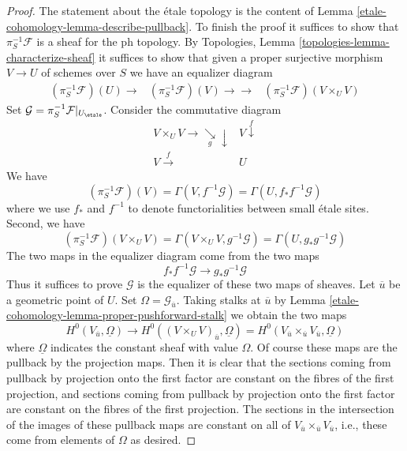 \begin{proof}
The statement about the \'etale topology is the content
of Lemma \ref{etale-cohomology-lemma-describe-pullback}. To finish the proof it
suffices to show that $\pi_S^{-1}\mathcal{F}$ is a sheaf for the ph
topology. By Topologies, Lemma \ref{topologies-lemma-characterize-sheaf}
it suffices to show that given a proper surjective morphism
$V \to U$ of schemes over $S$ we have an equalizer diagram
$$
\begin{array}{ccc}(\pi_S^{-1}\mathcal{F})(U) \longrightarrow & (\pi_S^{-1}\mathcal{F})(V) \longrightarrow\longrightarrow & (\pi_S^{-1}\mathcal{F})(V \times_U V)\end{array}
$$
Set $\mathcal{G} = \pi_S^{-1}\mathcal{F}|_{U_\etale}$.
Consider the commutative diagram
$$
\begin{array}{cc}V \times_U V \longrightarrow\underset{g}{\searrow}\downarrow & V \overset{f}{\downarrow} \\ V \overset{f}{\longrightarrow} & U\end{array}
$$
We have
$$
(\pi_S^{-1}\mathcal{F})(V) = \Gamma(V, f^{-1}\mathcal{G}) =
\Gamma(U, f_*f^{-1}\mathcal{G})
$$
where we use $f_*$ and $f^{-1}$ to denote functorialities between
small \'etale sites. Second, we have
$$
(\pi_S^{-1}\mathcal{F})(V \times_U V) =
\Gamma(V \times_U V, g^{-1}\mathcal{G}) =
\Gamma(U, g_*g^{-1}\mathcal{G})
$$
The two maps in the equalizer diagram come from the two maps
$$
f_*f^{-1}\mathcal{G} \longrightarrow g_*g^{-1}\mathcal{G}
$$
Thus it suffices to prove $\mathcal{G}$ is
the equalizer of these two maps of sheaves.
Let $\overline{u}$ be a geometric point of $U$. Set
$\Omega = \mathcal{G}_{\overline{u}}$.
Taking stalks at $\overline{u}$ by
Lemma \ref{etale-cohomology-lemma-proper-pushforward-stalk}
we obtain the two maps
$$
H^0(V_{\overline{u}}, \underline{\Omega}) \longrightarrow
H^0((V \times_U V)_{\overline{u}}, \underline{\Omega}) =
H^0(V_{\overline{u}} \times_{\overline{u}} V_{\overline{u}},
\underline{\Omega})
$$
where $\underline{\Omega}$ indicates the constant sheaf with value
$\Omega$. Of course these maps are the pullback by the projection maps.
Then it is clear that the sections coming from pullback
by projection onto the first factor are constant on the fibres of
the first projection, and sections coming from pullback
by projection onto the first factor are constant on the fibres of
the first projection. The sections in the intersection of the images
of these pullback maps are constant on all of
$V_{\overline{u}} \times_{\overline{u}} V_{\overline{u}}$, i.e.,
these come from elements of $\Omega$ as desired.
\end{proof}


